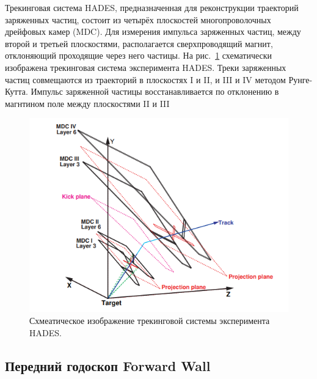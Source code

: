 Трекинговая система HADES, предназначенная для реконструкции траекторий заряженных частиц, состоит из четырёх плоскостей многопроволочных дрейфовых камер (MDC).
Для измерения импульса заряженных частиц, между второй и третьей плоскостями, располагается сверхпроводящий магнит, отклоняющий проходящие через него частицы.
На рис.~\ref{fig:hades_tracking} схематически изображена трекинговая система эксперимента HADES.
Треки заряженных частиц совмещаются из траекторий в плоскостях I и II, и III и IV методом Рунге-Кутта.
Импульс заряженной частицы восстанавливается по отклонению в магнтином поле между плоскостями II и III 
%
\begin{figure}[ht]
\begin{center}
    \includegraphics[width=0.55\linewidth]{images/hades_tracking_system.png}
    \caption{Схмеатическое изображение трекинговой системы эксперимента HADES.}
    \label{fig:hades_tracking}
\end{center}
\end{figure}

\subsection{Передний годоскоп Forward Wall}

